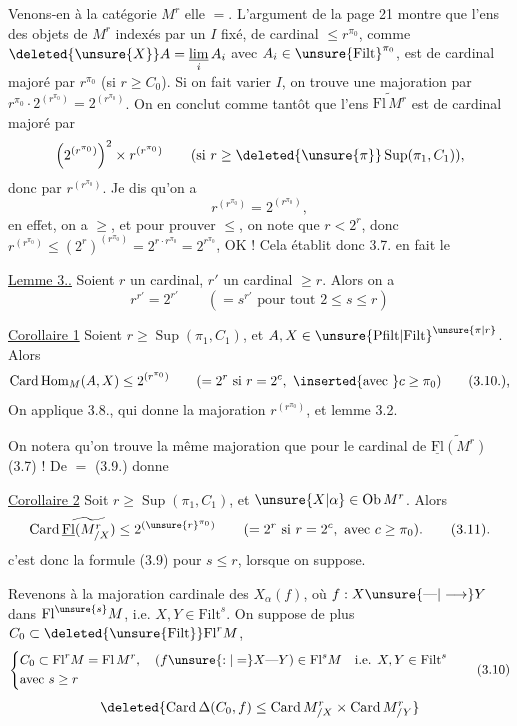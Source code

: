 Venons-en à la catégorie $M^r$ elle $=$. L'argument
de la page 21 montre que l'ens des 
objets de $M^r$ indexés par un $I$ fixé, de cardinal $\leq r^{\pi_0}$, comme
$\deleted{\unsure{X}}A=\underset{i}{\underline{\lim}}\,A_i$ avec $A_i\in\unsure{\mathrm{Filt}}^{\pi_0}$, est de cardinal
majoré par $r^{\pi_0}$ (si $r\geq C_0$). Si on fait varier
$I$, on trouve  une majoration par $r^{\pi_0}\mathbin{\cdot}2^{(r^{\pi_0})}
=2^{(r^{\pi_0})}$. On en conclut comme tantôt que
l'ens $\widetilde{\mathrm{Fl}\, M^r}$ est de cardinal majoré par
\[
\left(2^{(r^{\pi_0})}\right)^2\times r^{(r^{\pi_0})}
\qquad(\text{si }r\geq\deleted{\unsure{\pi}}\operatorname{Sup}(\pi_1,C_1)),
\]
donc par $r^{(r^{\pi_0})}$. Je dis qu'on a
\[
r^{(r^{\pi_0})}=2^{(r^{\pi_0})},
\]
en effet, on a $\geq$, et pour prouver $\leq$, on
note que $r<2^r$, donc $r^{(r^{\pi_0})}\leq(2^r)^{(r^{\pi_0})}=2^{r\mathbin{\cdot}r^{\pi_0}}=2^{r^{\pi_0}}$,
OK ! Cela établit donc 3.7.  
 en fait le

\uline{Lemme 3..} Soient $r$ un cardinal, $r'$ un cardinal $\geq r$. Alors
on a
\[
r^{r'}=2^{r'}\qquad(=s^{r'}\text{ pour tout }2\leq s\leq r)
\]

\uline{Corollaire 1} Soient  $r\geq\operatorname{Sup}(\pi_1,C_1)$,
et $A,X\in\unsure{\mathrm{Pfilt}|\mathrm{Filt}}^{\unsure{\pi|r}}$. Alors
\[
\operatorname{Card}\operatorname{Hom}_M(A,X)\leq 2^{(r^{\pi_0})}
\qquad(=2^r\text{ si }r=2^c,\ \inserted{\text{avec }}c\geq\pi_0)
\tag*{(3.10.),}
\]
On applique 3.8.,  qui donne la majoration
$r^{(r^{\pi_0})}$, et  lemme 3.2.

 On notera qu'on trouve la même
majoration que pour le cardinal de $\widetilde{\underline{\mathrm{Fl}}(M^r)}$
 (3.7) ! De $=$ (3.9.) donne

\uline{Corollaire 2} Soit $r\geq\operatorname{Sup}(\pi_1,C_1)$, et $\unsure{X|\alpha}\in\operatorname{Ob}M^r$. Alors
\[
\operatorname{Card}\widetilde{\underline{\mathrm{Fl}}(M^r_{/X})}\leq 2^{(\unsure{r}^{\pi_0})}
\qquad(=2^r\text{ si }r=2^c,\text{ avec }c\geq\pi_0).
\tag*{(3.11).}
\]
c'est donc la formule (3.9) pour $s\leq r$, lorsque on
suppose.

Revenons à la majoration cardinale des
$X_\alpha(f)$, où $f:X\unsure{\text{---}|\longrightarrow}Y$  dans $\mathrm{Fl}^{\unsure{s}}M$, i.e.
$X,Y\in\mathrm{Filt}^s$. On suppose de plus $C_0\subset\deleted{\unsure{\mathrm{Filt}}}\mathrm{Fl}^rM$,
\[
\left\{\begin{aligned}
&C_0\subset\mathrm{Fl}^rM=\mathrm{Fl}\,M^r,\quad
(f\unsure{:|=}X\text{---}Y)\in\mathrm{Fl}^sM\quad\text{i.e. }X,Y\in\mathrm{Filt}^s\\
&\text{avec }s\geq r
\end{aligned}\right.
\tag*{(3.10)}
\]
\[
\deleted{\operatorname{Card}\Delta(C_0,f)\leq\operatorname{Card}M^r_{/X}\times\operatorname{Card}M^r_{/Y}}
\]

